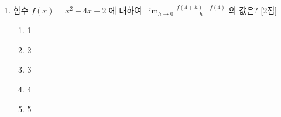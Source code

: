 \documentclass[10.5pt]{article}
\begin{document}
\begin{multicols}{2}
\begin{enumerate}
\item \leavevmode\begin{minipage}[t]{\linewidth}
함수 $f(x)=x^{2}-4 x+2$ 에 대하여 $\lim _{h \rightarrow 0} \frac{f(4+h)-f(4)}{h}$ 의 값은? [2점]
\vspace{0.5em}
\begin{enumerate}[label={\textcircled{\arabic*}}, itemsep=0.2em, topsep=0.2em, leftmargin=*, align=left]
\item 1
\item 2
\item 3
\item 4
\item 5
\end{enumerate}
\par\vspace{12\baselineskip}
\end{minipage}
\end{enumerate}\end{multicols}
\end{document}
